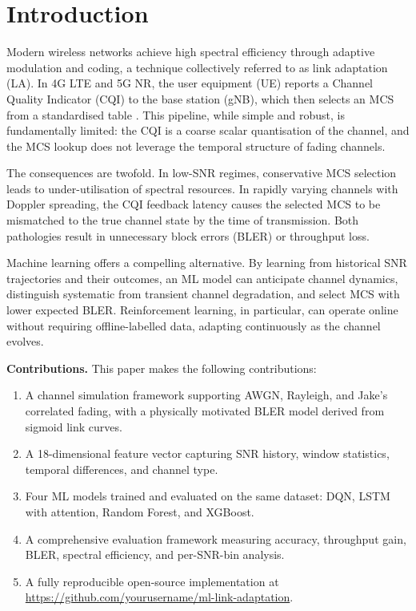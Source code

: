\documentclass[conference]{IEEEtran}
\begin{document}
\section{Introduction}

Modern wireless networks achieve high spectral efficiency through adaptive
modulation and coding, a technique collectively referred to as link adaptation
(LA). In 4G LTE and 5G NR, the user equipment (UE) reports a Channel Quality
Indicator (CQI) to the base station (gNB), which then selects an MCS from a
standardised table \cite{3gpp_38214}. This pipeline, while simple and robust,
is fundamentally limited: the CQI is a coarse scalar quantisation of the
channel, and the MCS lookup does not leverage the temporal structure of fading
channels.

The consequences are twofold. In low-SNR regimes, conservative MCS selection
leads to under-utilisation of spectral resources. In rapidly varying channels
with Doppler spreading, the CQI feedback latency causes the selected MCS to be
mismatched to the true channel state by the time of transmission. Both
pathologies result in unnecessary block errors (BLER) or throughput loss.

Machine learning offers a compelling alternative. By learning from historical
SNR trajectories and their outcomes, an ML model can anticipate channel
dynamics, distinguish systematic from transient channel degradation, and select
MCS with lower expected BLER. Reinforcement learning, in particular, can
operate online without requiring offline-labelled data, adapting continuously
as the channel evolves.

\textbf{Contributions.} This paper makes the following contributions:
\begin{enumerate}
  \item A channel simulation framework supporting AWGN, Rayleigh, and Jake's
        correlated fading, with a physically motivated BLER model derived from
        sigmoid link curves.
  \item A 18-dimensional feature vector capturing SNR history, window
        statistics, temporal differences, and channel type.
  \item Four ML models trained and evaluated on the same dataset: DQN, LSTM
        with attention, Random Forest, and XGBoost.
  \item A comprehensive evaluation framework measuring accuracy, throughput
        gain, BLER, spectral efficiency, and per-SNR-bin analysis.
  \item A fully reproducible open-source implementation at
        \url{https://github.com/yourusername/ml-link-adaptation}.
\end{enumerate}
\end{document}
